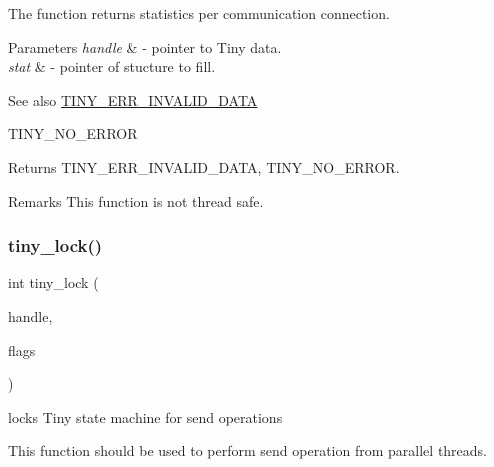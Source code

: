 The function returns statistics per communication connection. 
\begin{DoxyParams}{Parameters}
{\em handle} & -\/ pointer to Tiny data. \\
\hline
{\em stat} & -\/ pointer of stucture to fill. \\
\hline
\end{DoxyParams}
\begin{DoxySeeAlso}{See also}
\hyperlink{group__ERROR__FLAGS_ga541a9e67a84e39595ad647d641c4df2e}{T\+I\+N\+Y\+\_\+\+E\+R\+R\+\_\+\+I\+N\+V\+A\+L\+I\+D\+\_\+\+D\+A\+TA} 

T\+I\+N\+Y\+\_\+\+N\+O\+\_\+\+E\+R\+R\+OR 
\end{DoxySeeAlso}
\begin{DoxyReturn}{Returns}
T\+I\+N\+Y\+\_\+\+E\+R\+R\+\_\+\+I\+N\+V\+A\+L\+I\+D\+\_\+\+D\+A\+TA, T\+I\+N\+Y\+\_\+\+N\+O\+\_\+\+E\+R\+R\+OR. 
\end{DoxyReturn}
\begin{DoxyRemark}{Remarks}
This function is not thread safe. 
\end{DoxyRemark}
\mbox{\label{group__ADVANCED__API_gac318682c20279f9f20ffc6f636a7f1c9}} 
\subsubsection{\texorpdfstring{tiny\+\_\+lock()}{tiny\_lock()}}
{\footnotesize\ttfamily int tiny\+\_\+lock (\begin{DoxyParamCaption}\item[{\hyperlink{structSTinyData}{S\+Tiny\+Data} $\ast$}]{handle,  }\item[{uint8\+\_\+t}]{flags }\end{DoxyParamCaption})}



locks Tiny state machine for send operations 

This function should be used to perform send operation from parallel threads.


